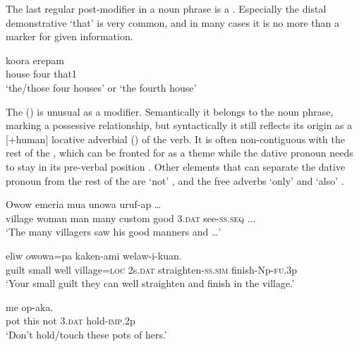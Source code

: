 The last regular post-modifier in a noun phrase is a . Especially the distal demonstrative  `that' is very common, and in many cases it is no more than a marker for given information.

\ea%
\label{ex:4:x805}
\gll koora  erepam   \\
 house  four  that1     \\
\glt`the/those four houses' or `the fourth house'
\z

The  () is unusual as a modifier. Semantically it belongs to the noun phrase, marking a possessive relationship, but syntactically it still reflects its origin as a [+human] locative adverbial () of the verb. It is often non-contiguous with the rest of the , which can be fronted for as a theme  while the dative pronoun needs to stay in its pre-verbal position . Other elements that can separate the dative pronoun from the rest of the  are  `not' , and the free adverbs  `only' and  `also' . 

\ea%
\label{ex:4:x1793}
\gll Owow  emeria  mua  unowa       uruf-ap  {\dots} \\
  village  woman  man  many  custom  good  3.\textsc{dat}  see-\textsc{ss}.\textsc{seq}  ...    \\
\glt`The many villagers saw his good manners and {\dots}'
\z

\ea%
\label{ex:4:x1811}
\gll {}    eliw  owowa=pa    kaken-ami  welaw-i-kuan.\\
  guilt  small  well  village=\textsc{loc}  2s.\textsc{dat}  straighten-\textsc{ss}.\textsc{sim}  finish-Np-\textsc{fu}.3p    \\
\glt`Your small guilt they can well straighten and finish in the village.'
\z

\ea%
\label{ex:4:x1812}
\gll {}   me    op-aka. \\
 pot  this  not  3.\textsc{dat}  hold-\textsc{imp}.2p     \\
\glt`Don't hold/touch these pots of hers.'
\z

